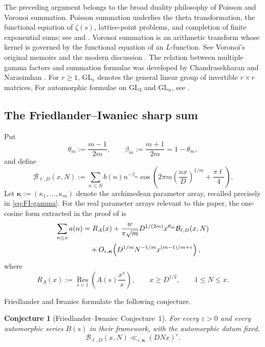 \documentclass[11pt]{amsart}
\theoremstyle{plain}
\newtheorem{conjecture}[theorem]{Conjecture}
\theoremstyle{definition}
\theoremstyle{remark}
\newcommand{\Bcal}{\mathcal B}
\newcommand{\Res}{\operatorname*{Res}}
\numberwithin{equation}{section}
\begin{document}
The preceding argument belongs to the broad duality philosophy of Poisson and
Voronoi summation. Poisson summation underlies the theta transformation, the functional equation of $\zeta(s)$, lattice-point problems, and completion of finite exponential sums;
see \cite[\S4.3]{IwaniecKowalski} and
\cite[(1.1), \S2]{MillerSchmid}. Voronoi summation is an arithmetic transform whose kernel is governed by the
functional equation of an $L$-function.  See Vorono\"i's original memoirs
\cite{Voronoi1904a,Voronoi1904b} and the modern discussion
\cite[\S3]{MillerSchmid}. The relation between multiple gamma factors and summation
formulae was developed by Chandrasekharan and Narasimhan
\cite{ChandrasekharanNarasimhan}.  For $r\ge1$, $\mathrm{GL}_r$ denotes
the general linear group of invertible $r\times r$ matrices.  For automorphic
formulae on $\mathrm{GL}_3$ and $\mathrm{GL}_n$, see
\cite{MillerSchmidGL3,MillerSchmidGLn}.

\subsection{The Friedlander--Iwaniec sharp sum}

Put
\[
  \theta_m:=\frac{m-1}{2m},
  \qquad
  \beta_m:=\frac{m+1}{2m}=1-\theta_m,
\]
and define
\begin{equation}\label{eq:FI-B-intro}
  \Bcal_{\ell,D}(x,N)
  :=\sum_{n\le N}b(n)n^{-\beta_m}
  \cos\!\left(
    2\pi m\left(\frac{nx}{D}\right)^{1/m}
    +\frac{\pi\ell}{4}
  \right).
\end{equation}
Let $\boldsymbol\kappa:=(\kappa_1,\ldots,\kappa_m)$ denote the
archimedean parameter array, recalled precisely in \eqref{eq:FI-gamma}.  For
the real parameter arrays relevant to this paper, the one-cosine form extracted
in the proof of \cite[Theorem~1.2]{FriedlanderIwaniec} is
\begin{align}
  \sum_{n\le x}a(n)
  &=R_A(x)
   +\frac{w}{\pi\sqrt m}D^{1/(2m)}x^{\theta_m}
    \Bcal_{\ell,D}(x,N) \notag\\
  &\quad+O_{\varepsilon,\boldsymbol\kappa}\!\left(
      D^{1/m}N^{-1/m}x^{(m-1)/m+\varepsilon}
    \right),
  \label{eq:FI-formula-intro}
\end{align}
where
\[
  R_A(x):=\Res_{s=1}\!\left(A(s)\frac{x^s}{s}\right),
  \qquad x\ge D^{1/2},
  \qquad 1\le N\le x.
\]


Friedlander and Iwaniec formulate the following conjecture.

\begin{conjecture}[Friedlander--Iwaniec Conjecture~1]\label{conj:FI1}
For every $\varepsilon>0$ and every automorphic series $B(s)$ in their
framework, with the automorphic datum fixed,
\begin{equation}\label{eq:FI-conj-intro}
  \Bcal_{\ell,D}(x,N)
  \ll_{\varepsilon,\boldsymbol\kappa}(DNx)^\varepsilon.
\end{equation}
\end{conjecture}
\end{document}
